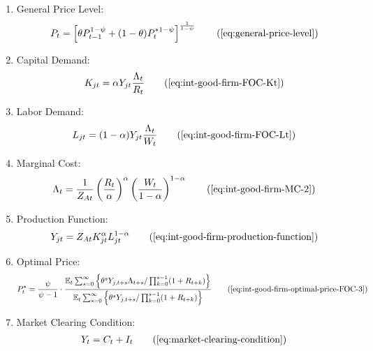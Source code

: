 \documentclass[
	12pt, 
	]{article}
\numberwithin{equation}{section}
\newcommand{\E}[1][t]{{\mathbb{E}_{#1}}}
\theoremstyle{definition}
\theoremstyle{plain}
\theoremstyle{plain}
\theoremstyle{plain}
\begin{document}
{\begin{itemize}
\begin{enumerate}
	\item General Price Level:
	\begin{align}
		P_t = \left[ \theta P_{t-1}^{1-\psi} + (1-\theta) P_t^{\ast 1-\psi} \right]^\frac{1}{1-\psi}
		\tag{\ref{eq:general-price-level}}
	\end{align}
		
	\item Capital Demand:
	\begin{align}
		K_{jt} = \alpha Y_{jt} \frac{\Lambda_t}{R_t}
		\tag{\ref{eq:int-good-firm-FOC-Kt}}
	\end{align}
		
	\item Labor Demand:
	\begin{align}
		L_{jt} = (1-\alpha) Y_{jt} \frac{\Lambda_t}{W_t}
		\tag{\ref{eq:int-good-firm-FOC-Lt}}
	\end{align}
		
	
	\item Marginal Cost:
	\begin{align}
		\Lambda_t = \frac{1}{Z_{At}} \left( \frac{R_t}{\alpha} \right)^{\alpha} \left( \frac{W_t}{1-\alpha} \right)^{1-\alpha}
		\tag{\ref{eq:int-good-firm-MC-2}}
	\end{align}
			
	\item Production Function:
	\begin{align}
		Y_{jt} = Z_{At} K_{jt}^\alpha L_{jt}^{1-\alpha}
		\tag{\ref{eq:int-good-firm-production-function}}
	\end{align}
		
	\item Optimal Price:
	\begin{align}
		P_t^\ast = \frac{\psi}{\psi-1} \cdot \frac{ \E \sum_{s=0}^{\infty} \left\{ \theta^s Y_{j,t+s} \Lambda_{t+s} / \prod_{k=0}^{s-1}(1+R_{t+k}) \right\} } {\E \sum_{s=0}^{\infty} \left\{ \theta^s Y_{j,t+s} / \prod_{k=0}^{s-1}(1 + R_{t+k}) \right\}} \tag{\ref{eq:int-good-firm-optimal-price-FOC-3}}
	\end{align}
		
	\item Market Clearing Condition:
	\begin{align}
		Y_t = C_t + I_t
		\tag{\ref{eq:market-clearing-condition}}
	\end{align}
		

\end{enumerate}
\end{itemize}}
\end{document}

